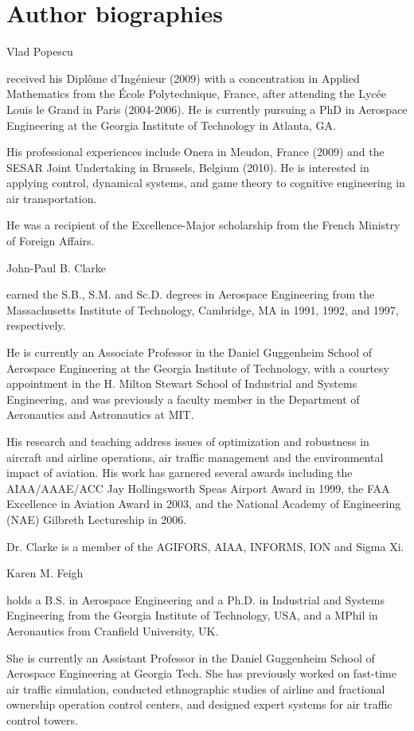 \documentclass[conference]{IEEEtran}
\begin{document}
\section*{Author biographies}
\IEEEoverridecommandlockouts
\vspace*{-4\baselineskip}
\begin{IEEEbiographynophoto}{Vlad Popescu}
\scriptsize{received his Dipl\^{o}me d'Ing\'{e}nieur (2009) with a concentration in Applied Mathematics from the \'{E}cole Polytechnique, France, after attending the Lyc\'{e}e Louis le Grand in Paris (2004-2006). He is currently pursuing a PhD in Aerospace Engineering at the Georgia Institute of Technology in Atlanta, GA. 

His professional experiences include Onera in Meudon, France (2009) and the SESAR Joint Undertaking in Brussels, Belgium (2010). He is interested in applying control, dynamical systems, and game theory to cognitive engineering in air transportation.

He was a recipient of the Excellence-Major scholarship from the French Ministry of Foreign Affairs.}
\end{IEEEbiographynophoto}
\vspace*{-4\baselineskip}
\begin{IEEEbiographynophoto}{John-Paul B. Clarke}
\scriptsize{earned the S.B., S.M. and Sc.D. degrees in Aerospace Engineering from the Massachusetts Institute of Technology, Cambridge, MA in 1991, 1992, and 1997, respectively.

He is currently an Associate Professor in the Daniel Guggenheim School of Aerospace Engineering at the Georgia Institute of Technology, with a courtesy appointment in the H. Milton Stewart School of Industrial and Systems Engineering, and was previously a faculty member in the Department of Aeronautics and Astronautics at MIT.

His research and teaching address issues of optimization and robustness in aircraft and airline operations, air traffic management and the environmental impact of aviation. His work has garnered several awards including the AIAA/AAAE/ACC Jay Hollingsworth Speas Airport Award in 1999, the FAA Excellence in Aviation Award in 2003, and the National Academy of Engineering (NAE) Gilbreth Lectureship in 2006.

Dr. Clarke is a member of the AGIFORS, AIAA, INFORMS, ION and Sigma Xi.}
\end{IEEEbiographynophoto}
\vspace*{-4\baselineskip}
\begin{IEEEbiographynophoto}{Karen M. Feigh}
\scriptsize{holds a B.S. in Aerospace Engineering and a Ph.D. in Industrial and Systems Engineering from the Georgia Institute of Technology, USA, and a MPhil in Aeronautics from Cranfield University, UK.

She is currently an Assistant Professor in the Daniel Guggenheim School of Aerospace Engineering at Georgia Tech. She has previously worked on fast-time air traffic simulation, conducted ethnographic studies of airline and fractional ownership operation control centers, and designed expert systems for air traffic control towers.}
\end{IEEEbiographynophoto}
\end{document}
